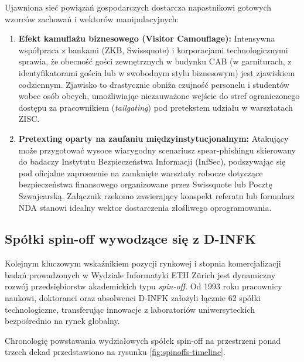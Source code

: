 
Ujawniona sieć powiązań gospodarczych dostarcza napastnikowi gotowych wzorców zachowań i wektorów manipulacyjnych:

\begin{enumerate}
    \item \textbf{Efekt kamuflażu biznesowego (Visitor Camouflage):} Intensywna współpraca z bankami (ZKB, Swissquote) i korporacjami technologicznymi sprawia, że obecność gości zewnętrznych w budynku CAB (w garniturach, z identyfikatorami gościa lub w swobodnym stylu biznesowym) jest zjawiskiem codziennym. Zjawisko to drastycznie obniża czujność personelu i studentów wobec osób obcych, umożliwiając niezauważone wejście do stref ograniczonego dostępu za pracownikiem (\textit{tailgating}) pod pretekstem udziału w warsztatach ZISC.
    \item \textbf{Pretexting oparty na zaufaniu międzyinstytucjonalnym:} Atakujący może przygotować wysoce wiarygodny scenariusz spear-phishingu skierowany do badaczy Instytutu Bezpieczeństwa Informacji (InfSec), podszywając się pod oficjalne zaproszenie na zamknięte warsztaty robocze dotyczące bezpieczeństwa finansowego organizowane przez Swissquote lub Pocztę Szwajcarską. Załącznik rzekomo zawierający konspekt referatu lub formularz NDA stanowi idealny wektor dostarczenia złośliwego oprogramowania.
\end{enumerate}

\subsection{Spółki spin-off wywodzące się z D-INFK}\label{subsec:spinoffy}

Kolejnym kluczowym wskaźnikiem pozycji rynkowej i stopnia komercjalizacji badań prowadzonych w Wydziale Informatyki ETH Zürich jest dynamiczny rozwój przedsiębiorstw akademickich typu \textit{spin-off}. Od 1993 roku pracownicy naukowi, doktoranci oraz absolwenci D-INFK założyli łącznie 62 spółki technologiczne, transferując innowacje z laboratoriów uniwersyteckich bezpośrednio na rynek globalny.

Chronologię powstawania wydziałowych spółek spin-off na przestrzeni ponad trzech dekad przedstawiono na rysunku \ref{fig:spinoffs-timeline}.


